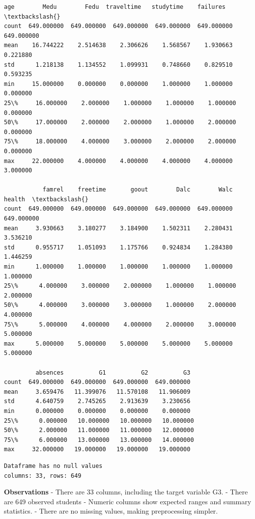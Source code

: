 \documentclass[9pt]{article}
\begin{document}
    \begin{Verbatim}[commandchars=\\\{\}]
              age        Medu        Fedu  traveltime   studytime    failures  \textbackslash{}
count  649.000000  649.000000  649.000000  649.000000  649.000000  649.000000   
mean    16.744222    2.514638    2.306626    1.568567    1.930663    0.221880   
std      1.218138    1.134552    1.099931    0.748660    0.829510    0.593235   
min     15.000000    0.000000    0.000000    1.000000    1.000000    0.000000   
25\%     16.000000    2.000000    1.000000    1.000000    1.000000    0.000000   
50\%     17.000000    2.000000    2.000000    1.000000    2.000000    0.000000   
75\%     18.000000    4.000000    3.000000    2.000000    2.000000    0.000000   
max     22.000000    4.000000    4.000000    4.000000    4.000000    3.000000   

           famrel    freetime       goout        Dalc        Walc      health  \textbackslash{}
count  649.000000  649.000000  649.000000  649.000000  649.000000  649.000000   
mean     3.930663    3.180277    3.184900    1.502311    2.280431    3.536210   
std      0.955717    1.051093    1.175766    0.924834    1.284380    1.446259   
min      1.000000    1.000000    1.000000    1.000000    1.000000    1.000000   
25\%      4.000000    3.000000    2.000000    1.000000    1.000000    2.000000   
50\%      4.000000    3.000000    3.000000    1.000000    2.000000    4.000000   
75\%      5.000000    4.000000    4.000000    2.000000    3.000000    5.000000   
max      5.000000    5.000000    5.000000    5.000000    5.000000    5.000000   

         absences          G1          G2          G3  
count  649.000000  649.000000  649.000000  649.000000  
mean     3.659476   11.399076   11.570108   11.906009  
std      4.640759    2.745265    2.913639    3.230656  
min      0.000000    0.000000    0.000000    0.000000  
25\%      0.000000   10.000000   10.000000   10.000000  
50\%      2.000000   11.000000   11.000000   12.000000  
75\%      6.000000   13.000000   13.000000   14.000000  
max     32.000000   19.000000   19.000000   19.000000  
    \end{Verbatim}

    
    \begin{Verbatim}[commandchars=\\\{\}]
Dataframe has no null values
columns: 33, rows: 649
    \end{Verbatim}

    \textbf{Observations} - There are 33 columns, including the target
variable G3. - There are 649 observed students - Numeric columns show
expected ranges and summary statistics. - There are no missing values,
making preprocessing simpler.
\end{document}
